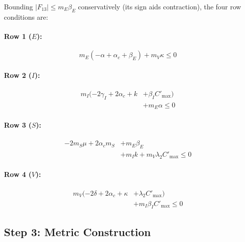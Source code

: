 \documentclass[11pt,twocolumn]{article}
\begin{document}
Bounding $|F_{13}| \leq m_E\beta_E$ conservatively (its sign aids
contraction), the four row conditions are:

\paragraph{Row 1 ($E$):}
\begin{equation}
  m_E(-\alpha + \alpha_c + \beta_E) + m_V\kappa \leq 0
  \label{eq:gersh-row1}
\end{equation}

\paragraph{Row 2 ($I$):}
\begin{equation}
  \begin{split}
  m_I(-2\gamma_I + 2\alpha_c + k &+ \beta_I C'_{\max}) \\
  &+ m_E\alpha \leq 0
  \end{split}
  \label{eq:gersh-row2}
\end{equation}

\paragraph{Row 3 ($S$):}
\begin{equation}
  \begin{split}
  -2m_S\mu + 2\alpha_c m_S &+ m_E\beta_E \\
  &+ m_I k + m_V\lambda_2 C'_{\max} \leq 0
  \end{split}
  \label{eq:gersh-row3}
\end{equation}

\paragraph{Row 4 ($V$):}
\begin{equation}
  \begin{split}
  m_V(-2\delta + 2\alpha_c + \kappa &+ \lambda_2 C'_{\max}) \\
  &+ m_I\beta_I C'_{\max} \leq 0
  \end{split}
  \label{eq:gersh-row4}
\end{equation}

\subsection*{Step 3: Metric Construction}
\end{document}

